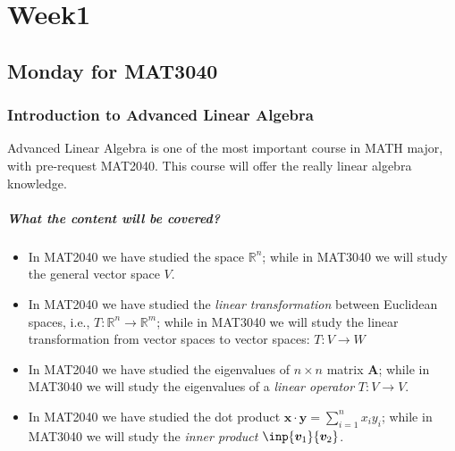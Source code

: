 
\chapter{Week1}
\section{Monday for MAT3040}

\subsection{Introduction to Advanced Linear Algebra}
Advanced Linear Algebra is one of the most important course in MATH major, with pre-request MAT2040. This course will offer the really linear algebra knowledge.
\paragraph{What the content will be covered?}
\begin{itemize}
\item
In MAT2040 we have studied the space $\mathbb{R}^n$; while in MAT3040 we will study the general vector space $V$. 
\item
In MAT2040 we have studied the \textit{linear transformation} between Euclidean spaces, i.e., $T:\mathbb{R}^n\to\mathbb{R}^m$; while in MAT3040 we will study the linear transformation from vector spaces to vector spaces: $T:V\to W$
\item
In MAT2040 we have studied the eigenvalues of $n\times n$ matrix $\bm A$; while in MAT3040 we will study the eigenvalues of a \emph{linear operator} $T:V\to V$.
\item
In MAT2040 we have studied the dot product $\bm x\cdot \bm y=\sum_{i=1}^nx_iy_i$; while in MAT3040 we will study the \emph{inner product} $\inp{\bm v_1}{\bm v_2}$.
\end{itemize}
